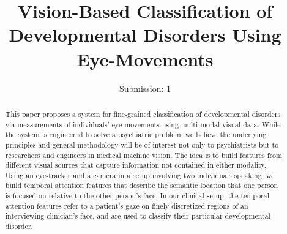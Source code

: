 \documentclass{llncs}
\begin{document}
\title{Vision-Based Classification of Developmental Disorders Using Eye-Movements}
\author{Submission: 1}
\institute{}


\maketitle

\begin{abstract}
This paper proposes a system for fine-grained classification of developmental disorders via measurements of individuals' eye-movements using multi-modal visual data. While the system is engineered to solve a psychiatric problem, we believe the underlying principles and general methodology will be of interest not only to psychiatrists but to researchers and engineers in medical machine vision. The idea is to build features from different visual sources that capture information not contained in either modality. Using an eye-tracker and a camera in a setup involving two individuals speaking, we build temporal attention features that describe the semantic location that one person is focused on relative to the other person's face. In our clinical setup, the temporal attention features refer to a patient's gaze on finely discretized regions of an interviewing clinician's face, and are used to classify their particular developmental disorder. 
\end{abstract}
   
\vspace{-2.5em} 
\end{document}
